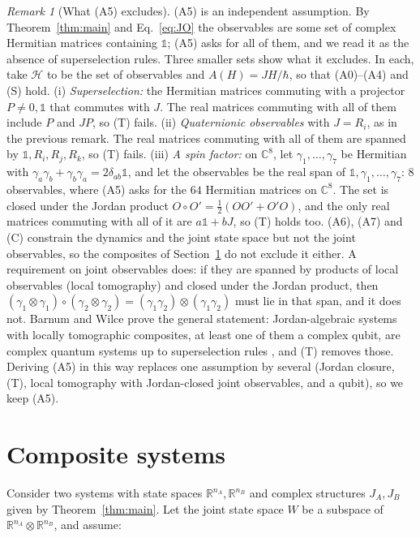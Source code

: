 \documentclass[11pt]{article}
\theoremstyle{remark}
\newtheorem{remark}[theorem]{Remark}
\newcommand{\R}{\mathbb{R}}
\newcommand{\C}{\mathbb{C}}
\newcommand{\one}{\mathbb{1}}
\begin{document}
\begin{remark}[What (A5) excludes]\label{rem:a5}
(A5) is an independent assumption. By Theorem~\ref{thm:main} and Eq.~\eqref{eq:JO} the observables are some set of complex Hermitian matrices containing $\one$; (A5) asks for all of them, and we read it as the absence of superselection rules. Three smaller sets show what it excludes. In each, take $\mathcal{H}$ to be the set of observables and $A(H)=JH/\hbar$, so that (A0)--(A4) and (S) hold.
(i) \emph{Superselection:} the Hermitian matrices commuting with a projector $P\neq0,\one$ that commutes with $J$. The real matrices commuting with all of them include $P$ and $JP$, so (T) fails.
(ii) \emph{Quaternionic observables} with $J=R_i$, as in the previous remark. The real matrices commuting with all of them are spanned by $\one,R_i,R_j,R_k$, so (T) fails.
(iii) \emph{A spin factor:} on $\C^8$, let $\gamma_1,\dots,\gamma_7$ be Hermitian with $\gamma_a\gamma_b+\gamma_b\gamma_a=2\delta_{ab}\one$, and let the observables be the real span of $\one,\gamma_1,\dots,\gamma_7$: $8$ observables, where (A5) asks for the $64$ Hermitian matrices on $\C^8$. The set is closed under the Jordan product $O\circ O'=\frac12(OO'+O'O)$, and the only real matrices commuting with all of it are $a\one+bJ$, so (T) holds too. (A6), (A7) and (C) constrain the dynamics and the joint state space but not the joint observables, so the composites of Section~\ref{sec:comp} do not exclude it either. A requirement on joint observables does: if they are spanned by products of local observables (local tomography) and closed under the Jordan product, then $(\gamma_1\otimes\gamma_1)\circ(\gamma_2\otimes\gamma_2)=(\gamma_1\gamma_2)\otimes(\gamma_1\gamma_2)$ must lie in that span, and it does not. Barnum and Wilce prove the general statement: Jordan-algebraic systems with locally tomographic composites, at least one of them a complex qubit, are complex quantum systems up to superselection rules \cite{BarnumWilce}, and (T) removes those. Deriving (A5) in this way replaces one assumption by several (Jordan closure, (T), local tomography with Jordan-closed joint observables, and a qubit), so we keep (A5).
\end{remark}

\section{Composite systems}\label{sec:comp}

Consider two systems with state spaces $\R^{n_A},\R^{n_B}$ and complex structures $J_A,J_B$ given by Theorem~\ref{thm:main}. Let the joint state space $W$ be a subspace of $\R^{n_A}\otimes\R^{n_B}$, and assume:
\end{document}
